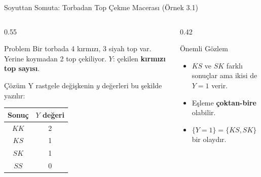 \documentclass[light]{lutbeamer}
\begin{document}
\begin{frame}{Soyuttan Somuta: Torbadan Top Çekme Macerası (Örnek 3.1)}
\footnotesize
\begin{columns}[T]
  \begin{column}{0.55\textwidth}
    \begin{block}{Problem}
      Bir torbada 4 kırmızı, 3 siyah top var. Yerine koymadan 2 top çekiliyor.
      $Y$: çekilen \textbf{kırmızı top sayısı}.
    \end{block}

    \begin{alertblock}{Çözüm}
      Y rastgele değişkenin $y$ değerleri bu şekilde yazılır:
      \vspace{0.15cm}\\
      \centering
      \begin{tabular}{cc}
        \toprule
        Sonuç & $Y$ değeri \\
        \midrule
        $KK$ & 2 \\
        $KS$ & 1 \\
        $SK$ & 1 \\
        $SS$ & 0 \\
        \bottomrule
      \end{tabular}
    \end{alertblock}
  \end{column}
  \begin{column}{0.42\textwidth}
    \begin{block}{Önemli Gözlem}
      \begin{itemize}
        \item $KS$ ve $SK$ farklı sonuçlar ama ikisi de $Y=1$ verir.
        \item Eşleme \textbf{çoktan-bire} olabilir.
        \item $\{Y=1\} = \{KS, SK\}$ bir olaydır.
      \end{itemize}
    \end{block}
  \end{column}
\end{columns}
\end{frame}
\end{document}
